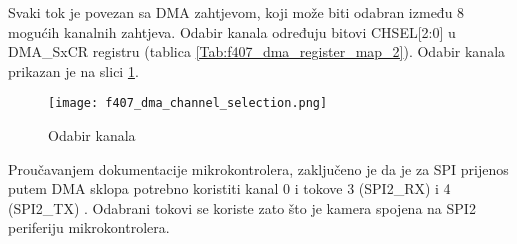 Svaki tok je povezan sa DMA zahtjevom, koji može biti odabran između 8 mogućih kanalnih zahtjeva. Odabir kanala određuju bitovi CHSEL[2:0] u DMA\_SxCR registru (tablica \ref{Tab:f407_dma_register_map_2}). Odabir kanala prikazan je na slici \ref{fig:f407_dma_channel_selection}.
\begin{table}[H]
	\caption{Registar DMA\_SxCR kod STM32F407VGT6 mikrokontrolera \citep{f407_manual}}
	\label{Tab:f407_dma_register_map_2}
\end{table} 
\begin{figure}[H]
	\centering
	\texttt{[image: f407\_dma\_channel\_selection.png]}
	\caption{Odabir kanala \citep{f407_manual}}
	\label{fig:f407_dma_channel_selection}
\end{figure}
Proučavanjem dokumentacije mikrokontrolera, zaključeno je da je za SPI prijenos putem DMA sklopa potrebno koristiti kanal 0 i tokove 3 (SPI2\_RX) i 4 (SPI2\_TX) \cite[str. 307]{f407_manual}. Odabrani tokovi se koriste zato što je kamera spojena na SPI2 periferiju mikrokontrolera.


